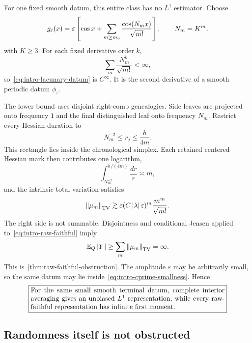 For one fixed smooth datum, this entire class has no $L^1$ estimator. Choose
\begin{equation}
  g_\varepsilon(x)
  =
  \varepsilon\left[
    \cos x+
    \sum_{m\geq m_0}
    \frac{\cos(N_mx)}{\sqrt{m!}}
  \right],
  \qquad
  N_m=K^m,
  \label{eq:intro-lacunary-datum}
\end{equation}
with $K\geq3$. For each fixed derivative order $k$,
\begin{equation*}
  \sum_m\frac{N_m^k}{\sqrt{m!}}<\infty,
\end{equation*}
so~\eqref{eq:intro-lacunary-datum} is $C^\infty$. It is the second derivative of a smooth periodic datum $\phi_\varepsilon$.

The lower bound uses disjoint right-comb genealogies. Side leaves are projected onto frequency $1$ and the final distinguished leaf onto frequency $N_m$. Restrict every Hessian duration to
\begin{equation*}
  N_m^{-2}\leq r_j\leq\frac{h}{4m}.
\end{equation*}
This rectangle lies inside the chronological simplex. Each retained centered Hessian mark then contributes one logarithm,
\begin{equation*}
  \int_{N_m^{-2}}^{h/(4m)}\frac{dr}{r}
  \asymp m,
\end{equation*}
and the intrinsic total variation satisfies
\begin{equation}
  \left\lVert\mu_m\right\rVert_{\mathrm{TV}}
  \gtrsim
  \varepsilon(C\left|\lambda\right|\varepsilon)^m
  \frac{m^m}{\sqrt{m!}}.
  \label{eq:intro-raw-tv}
\end{equation}
The right side is not summable. Disjointness and conditional Jensen applied to~\eqref{eq:intro-raw-faithful} imply
\begin{equation*}
  \mathbb E_Q\left|Y\right|
  \geq
  \sum_m\left\lVert\mu_m\right\rVert_{\mathrm{TV}}
  =\infty.
\end{equation*}
This is~\cref{thm:raw-faithful-obstruction}. The amplitude $\varepsilon$ may be arbitrarily small, so the same datum may lie inside~\eqref{eq:intro-cprime-smallness}. Hence
\begin{equation*}
  \boxed{
  \begin{minipage}{0.82\textwidth}
  For the same small smooth terminal datum, complete interior averaging gives an unbiased $L^1$ representation, while every raw-faithful representation has infinite first moment.
  \end{minipage}}
\end{equation*}

\subsection{Randomness itself is not obstructed}

